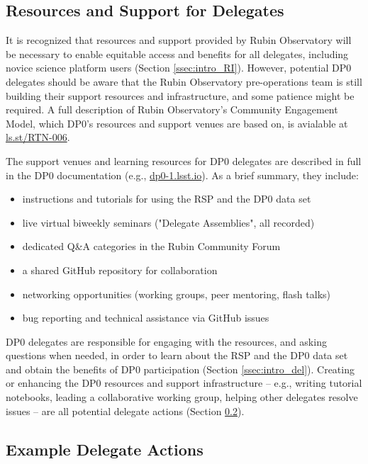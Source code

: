 \documentclass[DM,lsstdraft,authoryear,toc]{lsstdoc}
\begin{document}
\subsection{Resources and Support for Delegates}\label{ssec:res_sup}

It is recognized that resources and support provided by Rubin Observatory will be necessary to enable equitable access and benefits for all delegates, including novice science platform users (Section \ref{ssec:intro_RI}). 
However, potential DP0 delegates should be aware that the Rubin Observatory pre-operations team is still building their support resources and infrastructure, and some patience might be required. 
A full description of Rubin Observatory's Community Engagement Model, which DP0's resources and support venues are based on, is avialable at \url{ls.st/RTN-006}. 

The support venues and learning resources for DP0 delegates are described in full in the DP0 documentation (e.g., \url{dp0-1.lsst.io}). As a brief summary, they include:
\begin{itemize}
\item instructions and tutorials for using the RSP and the DP0 data set
\item live virtual biweekly seminars ("Delegate Assemblies", all recorded)
\item dedicated Q\&A categories in the Rubin Community Forum
\item a shared GitHub repository for collaboration
\item networking opportunities (working groups, peer mentoring, flash talks)
\item bug reporting and technical assistance via GitHub issues
\end{itemize}

DP0 delegates are responsible for engaging with the resources, and asking questions when needed, in order to learn about the RSP and the DP0 data set and obtain the benefits of DP0 participation (Section \ref{ssec:intro_del}).
Creating or enhancing the DP0 resources and support infrastructure -- e.g., writing tutorial notebooks, leading a collaborative working group, helping other delegates resolve issues -- are all potential delegate actions (Section \ref{ssec:res_act}).


\subsection{Example Delegate Actions}\label{ssec:res_act}
\end{document}
